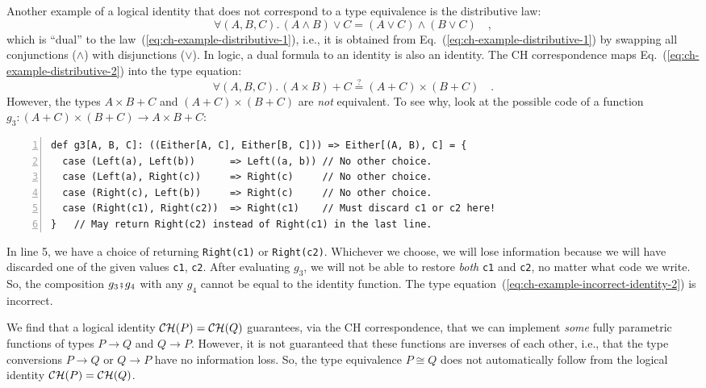 Another example of a logical identity that does not correspond to
a type equivalence is the distributive law:
\begin{equation}
\forall(A,B,C).\,\left(A\wedge B\right)\vee C=\left(A\vee C\right)\wedge\left(B\vee C\right)\quad,\label{eq:ch-example-distributive-2}
\end{equation}
which is \textsf{``}dual\textsf{''} to the law~(\ref{eq:ch-example-distributive-1}),
i.e., it is obtained from Eq.~(\ref{eq:ch-example-distributive-1})
by swapping all conjunctions ($\wedge$) with disjunctions ($\vee$).
In logic, a dual formula to an identity is also an identity. The CH
correspondence maps Eq.~(\ref{eq:ch-example-distributive-2}) into
the type equation:
\begin{equation}
\forall(A,B,C).\,\left(A\times B\right)+C\overset{?}{=}\left(A+C\right)\times\left(B+C\right)\quad.\label{eq:ch-example-incorrect-identity-2}
\end{equation}
However, the types $A\times B+C$ and $\left(A+C\right)\times\left(B+C\right)$
are \emph{not} equivalent. To see why, look at the possible code of
a function $g_{3}:\left(A+C\right)\times\left(B+C\right)\rightarrow A\times B+C$:
\begin{lstlisting}[numbers=left]
def g3[A, B, C]: ((Either[A, C], Either[B, C])) => Either[(A, B), C] = {
  case (Left(a), Left(b))      => Left((a, b)) // No other choice.
  case (Left(a), Right(c))     => Right(c)     // No other choice.
  case (Right(c), Left(b))     => Right(c)     // No other choice.
  case (Right(c1), Right(c2))  => Right(c1)    // Must discard c1 or c2 here!
}   // May return Right(c2) instead of Right(c1) in the last line.
\end{lstlisting}
In line 5, we have a choice of returning \lstinline!Right(c1)! or
\lstinline!Right(c2)!. Whichever we choose, we will lose information
because we will have discarded one of the given values \lstinline!c1!,
\lstinline!c2!. After evaluating $g_{3}$, we will not be able to
restore \emph{both} \lstinline!c1! and \lstinline!c2!, no matter
what code we write. So, the composition $g_{3}\bef g_{4}$ with any
$g_{4}$ cannot be equal to the identity function. The type equation~(\ref{eq:ch-example-incorrect-identity-2})
is incorrect.

We find that a logical identity ${\cal CH}(P)={\cal CH}(Q)$ guarantees,
via the CH correspondence, that we can implement \emph{some} fully
parametric functions of types $P\rightarrow Q$ and $Q\rightarrow P$.
However, it is not guaranteed that these functions are inverses of
each other, i.e., that the type conversions $P\rightarrow Q$ or $Q\rightarrow P$
have no information loss. So, the type equivalence
$P\cong Q$ does not automatically follow from the logical identity
${\cal CH}(P)={\cal CH}(Q)$.

